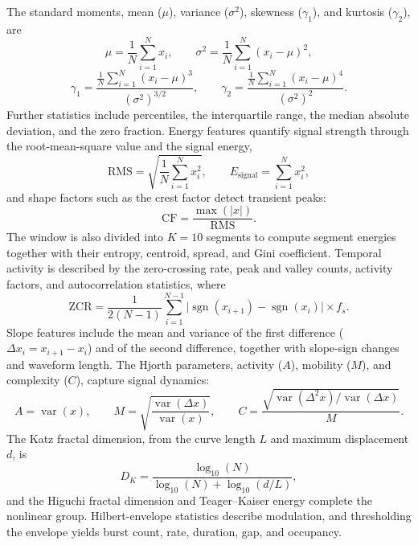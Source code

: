 The standard moments, mean ($\mu$), variance ($\sigma^2$), skewness ($\gamma_1$), and kurtosis ($\gamma_2$), are
\begin{equation}
	\mu = \frac{1}{N}\sum_{i=1}^{N} x_i, \qquad \sigma^2 = \frac{1}{N}\sum_{i=1}^{N}(x_i - \mu)^2,
	\label{eq:meanvar}
\end{equation}
\begin{equation}
	\gamma_1 = \frac{\frac{1}{N}\sum_{i=1}^{N}(x_i - \mu)^3}{(\sigma^2)^{3/2}}, \qquad
	\gamma_2 = \frac{\frac{1}{N}\sum_{i=1}^{N}(x_i - \mu)^4}{(\sigma^2)^2}.
	\label{eq:skewkurt}
\end{equation}
Further statistics include percentiles, the interquartile range, the median absolute deviation, and the zero fraction. Energy features quantify signal strength through the root-mean-square value and the signal energy,
\begin{equation}
	\mathrm{RMS} = \sqrt{\frac{1}{N}\sum_{i=1}^{N} x_i^2}, \qquad E_{\mathrm{signal}} = \sum_{i=1}^{N} x_i^2,
	\label{eq:rmsenergy}
\end{equation}
and shape factors such as the crest factor detect transient peaks:
\begin{equation}
	\mathrm{CF} = \frac{\max(|x|)}{\mathrm{RMS}}.
	\label{eq:crest}
\end{equation}
The window is also divided into $K = 10$ segments to compute segment energies together with their entropy, centroid, spread, and Gini coefficient. Temporal activity is described by the zero-crossing rate, peak and valley counts, activity factors, and autocorrelation statistics, where
\begin{equation}
	\mathrm{ZCR} = \frac{1}{2(N-1)}\sum_{i=1}^{N-1} \bigl|\operatorname{sgn}(x_{i+1}) - \operatorname{sgn}(x_i)\bigr| \times f_s .
	\label{eq:zcr}
\end{equation}
Slope features include the mean and variance of the first difference ($\Delta x_i = x_{i+1} - x_i$) and of the second difference, together with slope-sign changes and waveform length. The Hjorth parameters, activity ($A$), mobility ($M$), and complexity ($C$), capture signal dynamics:
\begin{equation}
	A = \operatorname{var}(x), \qquad
	M = \sqrt{\frac{\operatorname{var}(\Delta x)}{\operatorname{var}(x)}}, \qquad
	C = \frac{\sqrt{\operatorname{var}(\Delta^2 x)/\operatorname{var}(\Delta x)}}{M}.
	\label{eq:hjorth}
\end{equation}
The Katz fractal dimension, from the curve length $L$ and maximum displacement $d$, is
\begin{equation}
	D_K = \frac{\log_{10}(N)}{\log_{10}(N) + \log_{10}(d/L)},
	\label{eq:katz}
\end{equation}
and the Higuchi fractal dimension and Teager--Kaiser energy complete the nonlinear group. Hilbert-envelope statistics describe modulation, and thresholding the envelope yields burst count, rate, duration, gap, and occupancy.

